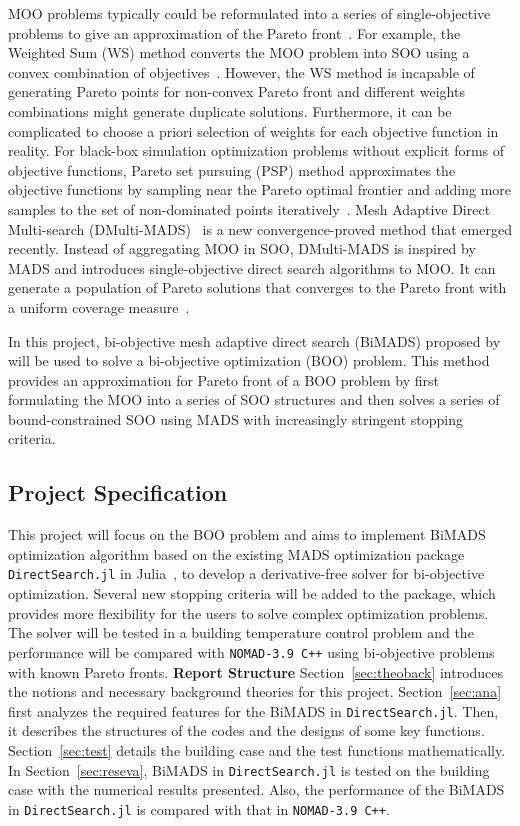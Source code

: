 \documentclass[11pt,oneside,onecolumn,openright]{article}
\begin{document}
  MOO problems typically could be reformulated into a series of single-objective problems to give an approximation of the Pareto front~\cite{abraham2005evolutionary}. For example, the Weighted Sum (WS) method converts the MOO problem into SOO using a convex combination of objectives~\cite{cohon2004multiobjective}. However, the WS method is incapable of generating Pareto points for non-convex Pareto front and different weights combinations might generate duplicate solutions. Furthermore, it can be complicated to choose a priori selection of weights for each objective function in reality. For black-box simulation optimization problems without explicit forms of objective functions, Pareto set pursuing (PSP) method approximates the objective functions by sampling near the Pareto optimal frontier and adding more samples to the set of non-dominated points iteratively~\cite{shan2005efficient}. Mesh Adaptive Direct Multi-search (DMulti-MADS)~\cite{bigeon2021dmulti} is a new convergence-proved method that emerged recently. Instead of aggregating MOO in SOO, DMulti-MADS is inspired by MADS and introduces single-objective direct search algorithms to MOO. It can generate a population of Pareto solutions that converges to the Pareto front with a uniform coverage measure~\cite{audet2017derivative}.

  In this project, bi-objective mesh adaptive direct search (BiMADS) proposed by~\cite{audet2008multiobjective} will be used to solve a bi-objective optimization (BOO) problem. This method provides an approximation for Pareto front of a BOO problem by first formulating the MOO into a series of SOO structures and then solves a series of bound-constrained SOO using MADS with increasingly stringent stopping criteria.

  \subsection{Project Specification}
  This project will focus on the BOO problem and aims to implement BiMADS optimization algorithm based on the existing MADS optimization package \verb|DirectSearch.jl| in Julia~\cite{originalMADS}, to develop a derivative-free solver for bi-objective optimization. Several new stopping criteria will be added to the package, which provides more flexibility for the users to solve complex optimization problems. The solver will be tested in a building temperature control problem and the performance will be compared with \verb|NOMAD-3.9 C++| using bi-objective problems with known Pareto fronts.
  \newline
  \noindent\textbf{Report Structure }\quad Section~\ref{sec:theoback} introduces the notions and necessary background theories for this project. Section~\ref{sec:ana} first analyzes the required features for the BiMADS in \verb|DirectSearch.jl|. Then, it describes the structures of the codes and the designs of some key functions. Section~\ref{sec:test} details the building case and the test functions mathematically. In Section~\ref{sec:reseva}, BiMADS in \verb|DirectSearch.jl| is tested on the building case with the numerical results presented. Also, the performance of the BiMADS in \verb|DirectSearch.jl| is compared with that in \verb|NOMAD-3.9 C++|.
\end{document}
